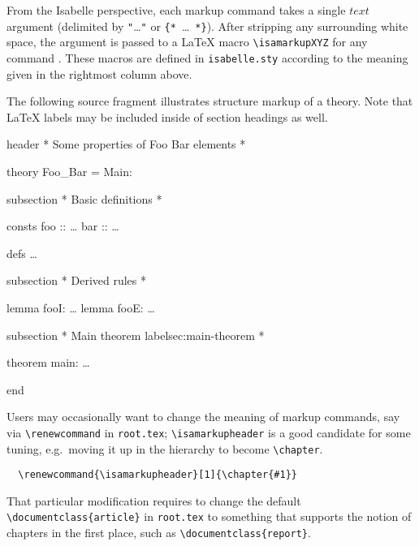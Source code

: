 \begin{isabellebody}
\begin{isamarkuptext}
  From the Isabelle perspective, each markup command takes a single
  $text$ argument (delimited by \verb,",\dots\verb,", or
  \verb,{,\verb,*,~\dots~\verb,*,\verb,},).  After stripping any
  surrounding white space, the argument is passed to a {\LaTeX} macro
  \verb,\isamarkupXYZ, for any command .  These macros
  are defined in \verb,isabelle.sty, according to the meaning given in
  the rightmost column above.

  \medskip The following source fragment illustrates structure markup
  of a theory.  Note that {\LaTeX} labels may be included inside of
  section headings as well.

  \begin{ttbox}
  header {\ttlbrace}* Some properties of Foo Bar elements *{\ttrbrace}

  theory Foo_Bar = Main:

  subsection {\ttlbrace}* Basic definitions *{\ttrbrace}

  consts
    foo :: \dots
    bar :: \dots

  defs \dots

  subsection {\ttlbrace}* Derived rules *{\ttrbrace}

  lemma fooI: \dots
  lemma fooE: \dots

  subsection {\ttlbrace}* Main theorem {\ttback}label{\ttlbrace}sec:main-theorem{\ttrbrace} *{\ttrbrace}

  theorem main: \dots

  end
  \end{ttbox}

  Users may occasionally want to change the meaning of markup
  commands, say via \verb,\renewcommand, in \texttt{root.tex};
  \verb,\isamarkupheader, is a good candidate for some tuning, e.g.\
  moving it up in the hierarchy to become \verb,\chapter,.

\begin{verbatim}
  \renewcommand{\isamarkupheader}[1]{\chapter{#1}}
\end{verbatim}

  \noindent That particular modification requires to change the
  default \verb,\documentclass{article}, in \texttt{root.tex} to
  something that supports the notion of chapters in the first place,
  such as \verb,\documentclass{report},.


\end{isamarkuptext}
\end{isabellebody}

